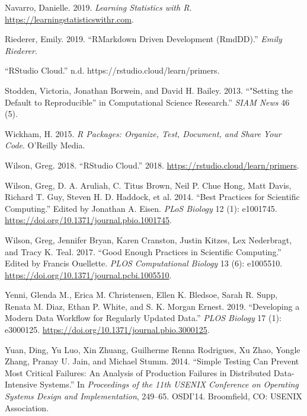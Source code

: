 \documentclass[
]{article}
\newlength{\cslhangindent}
\newenvironment{cslreferences}%
  {\setlength{\parindent}{0pt}%
  \everypar{\setlength{\hangindent}{\cslhangindent}}\ignorespaces}%
  {\par}
\begin{document}
\begin{cslreferences}
\leavevmode\hypertarget{ref-navarro_learningstatistics_2019}{}%
Navarro, Danielle. 2019. \emph{Learning Statistics with R}. \url{https://learningstatisticswithr.com}.

\leavevmode\hypertarget{ref-riederer_rmarkdowndrivendevelopment_2019}{}%
Riederer, Emily. 2019. ``RMarkdown Driven Development (RmdDD).'' \emph{Emily Riederer}.

\leavevmode\hypertarget{ref-_rstudiocloud_}{}%
``RStudio Cloud.'' n.d. https://rstudio.cloud/learn/primers.

\leavevmode\hypertarget{ref-stodden_setting_2013}{}%
Stodden, Victoria, Jonathan Borwein, and David H. Bailey. 2013. ``"Setting the Default to Reproducible'' in Computational Science Research.'' \emph{SIAM News} 46 (5).

\leavevmode\hypertarget{ref-wickham_r_2015}{}%
Wickham, H. 2015. \emph{R Packages: Organize, Test, Document, and Share Your Code}. O'Reilly Media.

\leavevmode\hypertarget{ref-wilson_rstudiocloud_2018}{}%
Wilson, Greg. 2018. ``RStudio Cloud.'' 2018. \url{https://rstudio.cloud/learn/primers}.

\leavevmode\hypertarget{ref-wilson_best_2014}{}%
Wilson, Greg, D. A. Aruliah, C. Titus Brown, Neil P. Chue Hong, Matt Davis, Richard T. Guy, Steven H. D. Haddock, et al. 2014. ``Best Practices for Scientific Computing.'' Edited by Jonathan A. Eisen. \emph{PLoS Biology} 12 (1): e1001745. \url{https://doi.org/10.1371/journal.pbio.1001745}.

\leavevmode\hypertarget{ref-wilson_good_2017}{}%
Wilson, Greg, Jennifer Bryan, Karen Cranston, Justin Kitzes, Lex Nederbragt, and Tracy K. Teal. 2017. ``Good Enough Practices in Scientific Computing.'' Edited by Francis Ouellette. \emph{PLOS Computational Biology} 13 (6): e1005510. \url{https://doi.org/10.1371/journal.pcbi.1005510}.

\leavevmode\hypertarget{ref-yenni_developingmoderndata_2019}{}%
Yenni, Glenda M., Erica M. Christensen, Ellen K. Bledsoe, Sarah R. Supp, Renata M. Diaz, Ethan P. White, and S. K. Morgan Ernest. 2019. ``Developing a Modern Data Workflow for Regularly Updated Data.'' \emph{PLOS Biology} 17 (1): e3000125. \url{https://doi.org/10.1371/journal.pbio.3000125}.

\leavevmode\hypertarget{ref-yuan_simpletestingcan_2014}{}%
Yuan, Ding, Yu Luo, Xin Zhuang, Guilherme Renna Rodrigues, Xu Zhao, Yongle Zhang, Pranay U. Jain, and Michael Stumm. 2014. ``Simple Testing Can Prevent Most Critical Failures: An Analysis of Production Failures in Distributed Data-Intensive Systems.'' In \emph{Proceedings of the 11th USENIX Conference on Operating Systems Design and Implementation}, 249--65. OSDI'14. Broomfield, CO: USENIX Association.
\end{cslreferences}
\end{document}
